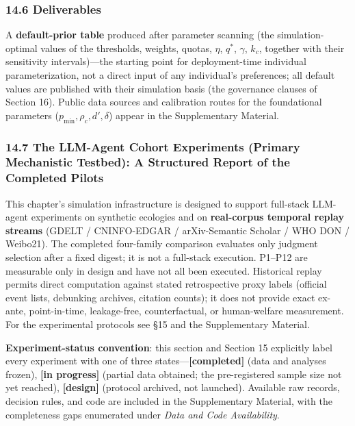 \documentclass[
  11pt]{article}
\begin{document}
\subsubsection{14.6 Deliverables}\label{deliverables}

A \textbf{default-prior table} produced after parameter scanning (the
simulation-optimal values of the thresholds, weights, quotas, \(\eta\),
\(q^*\), \(\gamma\), \(k_c\), together with their sensitivity
intervals)---the starting point for deployment-time individual
parameterization, not a direct input of any individual's preferences;
all default values are published with their simulation basis (the
governance clauses of Section 16). Public data sources and calibration
routes for the foundational parameters
(\(p_{\min}, \rho_c, d', \delta\)) appear in the Supplementary Material.

\subsubsection{14.7 The LLM-Agent Cohort Experiments (Primary
Mechanistic Testbed): A Structured Report of the Completed
Pilots}\label{the-llm-agent-cohort-experiments-primary-mechanistic-testbed-a-structured-report-of-the-completed-pilots}

This chapter's simulation infrastructure is designed to support
full-stack LLM-agent experiments on synthetic ecologies and on
\textbf{real-corpus temporal replay streams} (GDELT / CNINFO-EDGAR /
arXiv-Semantic Scholar / WHO DON / Weibo21). The completed four-family
comparison evaluates only judgment selection after a fixed digest; it is
not a full-stack execution. P1--P12 are measurable only in design and
have not all been executed. Historical replay permits direct computation
against stated retrospective proxy labels (official event lists,
debunking archives, citation counts); it does not provide exact ex-ante,
point-in-time, leakage-free, counterfactual, or human-welfare
measurement. For the experimental protocols see §15 and the
Supplementary Material.

\textbf{Experiment-status convention}: this section and Section 15
explicitly label every experiment with one of three
states---\textbf{{[}completed{]}} (data and analyses frozen),
\textbf{{[}in progress{]}} (partial data obtained; the pre-registered
sample size not yet reached), \textbf{{[}design{]}} (protocol archived,
not launched). Available raw records, decision rules, and code are
included in the Supplementary Material, with the completeness gaps
enumerated under \emph{Data and Code Availability}.
\end{document}
